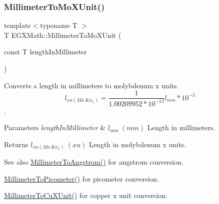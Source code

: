 \subsubsection{\texorpdfstring{Millimeter\+To\+Mo\+X\+Unit()}{MillimeterToMoXUnit()}}
{\footnotesize\ttfamily template$<$typename T $>$ \\
T E\+G\+X\+Math\+::\+Millimeter\+To\+Mo\+X\+Unit (\begin{DoxyParamCaption}\item[{const T}]{length\+In\+Millimeter }\end{DoxyParamCaption})}



Converts a length in millimeters to molybdenum x units. \[ l_{xu(Mo\ K\alpha_1)}=\frac{1}{1.00209952*10^{-13}} l_{mm} * 10^{-3}\]. 


\begin{DoxyParams}{Parameters}
{\em length\+In\+Millimeter} & $ l_{mm}\ (mm)$ Length in millimeters. \\
\hline
\end{DoxyParams}
\begin{DoxyReturn}{Returns}
$ l_{xu(Mo\ K\alpha_1)}\ (xu)$ Length in molybdenum x units. 
\end{DoxyReturn}
\begin{DoxySeeAlso}{See also}
\mbox{\hyperlink{group___e_g_x_math-_conversions-_length_conversions-_s_i-_millimeter-_non-_s_i_ga40e4659f4689e5be54f8e28fd8ce0008}{Millimeter\+To\+Angstrom()}} for angstrom conversion. 

\mbox{\hyperlink{group___e_g_x_math-_conversions-_length_conversions-_s_i-_millimeter-_s_i_ga679e3714c229f1355a5c9bf707fcd723}{Millimeter\+To\+Picometer()}} for picometer conversion. 

\mbox{\hyperlink{group___e_g_x_math-_conversions-_length_conversions-_s_i-_millimeter-_non-_s_i_gaa9a94e1f42047955530f673047c4370b}{Millimeter\+To\+Cu\+X\+Unit()}} for copper x unit conversion. 
\end{DoxySeeAlso}
